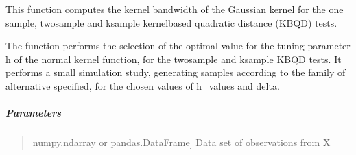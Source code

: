 \documentclass[letterpaper,10pt,english,openany,oneside]{sphinxmanual}
\begin{document}
{{{{\begin{fulllineitems}
\label{\detokenize{api_reference/generated/QuadratiK.kernel_test.select_h:QuadratiK.kernel_test.select_h}}
\pysigstartsignatures
{}
\pysigstopsignatures
\sphinxAtStartPar
This function computes the kernel bandwidth of the Gaussian kernel
for the one sample, two\sphinxhyphen{}sample and k\sphinxhyphen{}sample kernel\sphinxhyphen{}based quadratic
distance (KBQD) tests.

\sphinxAtStartPar
The function performs the selection of the optimal value for the tuning
parameter h of the normal kernel function, for the two\sphinxhyphen{}sample and k\sphinxhyphen{}sample
KBQD tests. It performs a small simulation study, generating samples according
to the family of alternative specified, for the chosen values
of h\_values and delta.


\subparagraph{Parameters}
\label{\detokenize{api_reference/generated/QuadratiK.kernel_test.select_h:parameters}}\begin{quote}
\begin{description}
\sphinxlineitem{x}{[}numpy.ndarray or pandas.DataFrame{]}
\sphinxAtStartPar
Data set of observations from X


\end{description}
\end{quote}
\end{fulllineitems}}}}}
\end{document}
